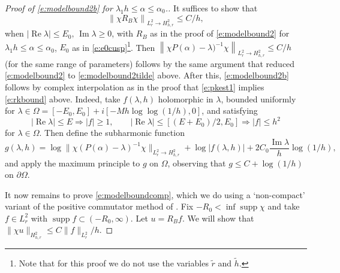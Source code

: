 \documentclass[reqno, 12pt]{amsart}
\newcommand \D {\partial}
\DeclareMathOperator \re {Re}
\DeclareMathOperator \im {Im}
\DeclareMathOperator \supp {supp}
\theoremstyle{definition}
\numberwithin{equation}{section}
\numberwithin{prop}{section}
\numberwithin{figure}{section}
\begin{document}
\begin{proof}[Proof of \eqref{e:modelbound2b} for $\lambda_1 h \le \alpha \le \alpha_0$.]
It suffices to show that
\begin{equation}\label{e:modelboundcomp}
\left\|\chi R_B \chi\right\|_{L^2_r \to H^2_{h,r}} \le C/h, \end{equation}
when $|\re \lambda| \le E_0, \,\im \lambda \ge 0$, with $R_B$ as in the proof of \eqref{e:modelbound2} for $\lambda_1 h \le \alpha \le \alpha_0$, $E_0$ as in \eqref{e:e0cusp}\footnote{Note that for this proof we do not use the variables $\tilde r$ and $\tilde h$.}. Then $\left\|\chi P(\alpha) - \lambda)^{-1} \chi\right\|_{L^2_r \to H^2_{h,r}} \le C/h$ (for the same range of parameters) follows by the same argument that reduced \eqref{e:modelbound2}  to \eqref{e:modelbound2tilde} above. After this, \eqref{e:modelbound2b}  follows by complex interpolation as in  the proof that \eqref{e:pkest1} implies \eqref{e:rkbound} above. Indeed,  take $f(\lambda,h)$ holomorphic in $\lambda$, bounded uniformly for $\lambda \in \Omega = [-E_0,E_0]  + i [-Mh\log\log(1/h),0]$, and satisfying
\[
|\re \lambda| \le E \Rightarrow |f| \ge 1, \qquad |\re \lambda| \le [(E+E_0)/2,E_0] \Rightarrow |f| \le h^2
\]
for $\lambda \in \Omega$. Then define the subharmonic function
\[
g(\lambda,h) = \log\|\chi (P(\alpha) - \lambda)^{-1}\chi\|_{L^2_r \to H^2_{h,r}} + \log|f(\lambda,h)| + 2C_0 \frac{\im \lambda} h \log(1/h),
\]
and apply the maximum principle to $g$ on $\Omega$, observing that $g \le C + \log(1/h)$ on $\D \Omega$.

 It now remains to prove \eqref{e:modelboundcomp}, which we do using a `non-compact' variant of the positive commutator method of \cite{Datchev-Vasy:Propagation}. Fix $-R_0 < \inf \supp \chi$ and take $f \in L^2_r$ with  $\supp f \subset (-R_0,\infty)$. Let $u = R_B f$. We will show that $\|\chi u\|_{H^2_{h,r}} \le C\|f\|_{L^2_r}/h$.
 

\end{proof}
\end{document}
